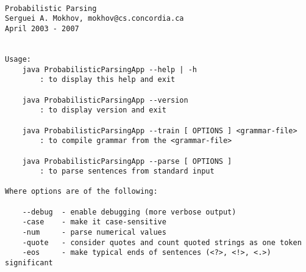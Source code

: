 \begin{verbatim}

Probabilistic Parsing
Serguei A. Mokhov, mokhov@cs.concordia.ca
April 2003 - 2007


Usage:
    java ProbabilisticParsingApp --help | -h
        : to display this help and exit

    java ProbabilisticParsingApp --version
        : to display version and exit

    java ProbabilisticParsingApp --train [ OPTIONS ] <grammar-file>
        : to compile grammar from the <grammar-file>

    java ProbabilisticParsingApp --parse [ OPTIONS ]
        : to parse sentences from standard input

Where options are of the following:

    --debug  - enable debugging (more verbose output)
    -case    - make it case-sensitive
    -num     - parse numerical values
    -quote   - consider quotes and count quoted strings as one token
    -eos     - make typical ends of sentences (<?>, <!>, <.>) significant


\end{verbatim}
